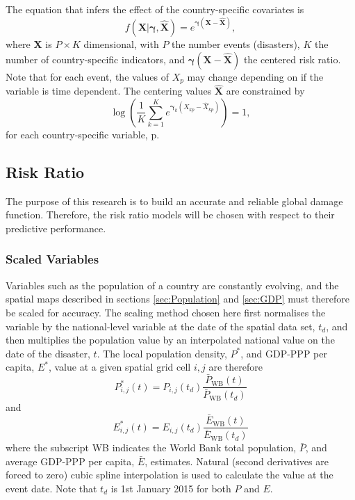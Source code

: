 \documentclass[10pt,a4paper]{article}
\begin{document}
\begin{multicols}{1}
The equation that infers the effect of the country-specific covariates is
\begin{equation}
  f(\mathbf{X}|\boldsymbol{\gamma},\hat{\mathbf{X}})=e^{\boldsymbol{\gamma}(\mathbf{X}-\hat{\mathbf{X}})},
\end{equation}
where $\mathbf{X}$ is $P\times K$ dimensional, with $P$ the number events (disasters), $K$ the number of country-specific indicators, and $\boldsymbol{\gamma}(\mathbf{X}-\hat{\mathbf{X}})$ the centered risk ratio. Note that for each event, the values of $X_p$ may change depending on if the variable is time dependent. The centering values $\hat{\mathbf{X}}$ are constrained by
\begin{equation}\label{eq:linpredcent}
  \log\left(\frac{1}{K}\sum_{k=1}^K e^{\boldsymbol{\gamma}_k(X_{kp}-\hat{X}_{kp})}\right)=1,
\end{equation}
for each country-specific variable, p.
\subsection{Risk Ratio}\label{sec:linpred}
The purpose of this research is to build an accurate and reliable global damage function. Therefore, the risk ratio models will be chosen with respect to their predictive performance.
\subsubsection{Scaled Variables}\label{sec:scalings}
Variables such as the population of a country are constantly evolving, and the spatial maps described in sections \ref{sec:Population} and \ref{sec:GDP} must therefore be scaled for accuracy. The scaling method chosen here first normalises the variable by the national-level variable at the date of the spatial data set, $t_d$, and then multiplies the population value by an interpolated national value on the date of the disaster, $t$. The local population density, $P^*$, and GDP-PPP per capita, $E^*$, value at a given spatial grid cell ${i,j}$ are therefore
\begin{equation}
  P^*_{i,j}(t)=P_{i,j}(t_d)\frac{\bar{P}_{\text{WB}}(t)}{\bar{P}_{\text{WB}}(t_d)}
\end{equation}
and
\begin{equation}\label{eq:centGDP}
  E^*_{i,j}(t)=E_{i,j}(t_d)\frac{\bar{E}_{\text{WB}}(t)}{\bar{E}_{\text{WB}}(t_d)}
\end{equation}
where the subscript WB indicates the World Bank total population, $\bar{P}$, and average GDP-PPP per capita, $\bar{E}$,  estimates. Natural (second derivatives are forced to zero) cubic spline interpolation is used to calculate the value at the event date. Note that $t_d$ is 1st January 2015 for both $P$ and $E$.

\end{multicols}
\end{document}
